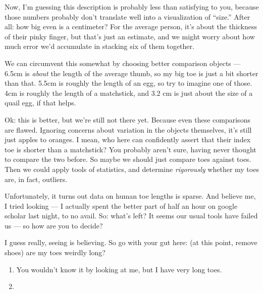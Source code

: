 \documentclass{fkpset}
\begin{document}
\begin{solution}[Outline.]
  Now, I'm guessing this description is probably less than satisfying to you,
  because those numbers probably don't translate well into a visualization of
  ``size.'' After all: how big even is a centimeter? For the average person,
  it's about the thickness of their pinky finger, but that's just an estimate,
  and we might worry about how much error we'd accumulate in stacking six of
  them together.

  We can circumvent this somewhat by choosing better comparison objects ---
  6.5\si{cm} is \emph{about} the length of the average thumb, so my big toe is
  just a bit shorter than that. 5.5\si{cm} is roughly the length of an egg, so
  try to imagine one of those. 4\si{cm} is roughly the length of a matchstick,
  and 3.2 \si{cm} is just about the size of a quail egg, if that helps.

  Ok: this is better, but we're still not there yet. Because even these
  comparisons are flawed. Ignoring concerns about variation in the objects
  themselves, it's still just apples to oranges. I mean, who here can
  confidently assert that their index toe is shorter than a matchstick? You
  probably aren't sure, having never thought to compare the two before. So maybe
  we should just compare toes against toes. Then we could apply tools of
  statistics, and determine \emph{rigorously} whether my toes are, in fact,
  outliers.

  Unfortunately, it turns out data on human toe lengths is sparse. And believe
  me, I tried looking --- I actually spent the better part of half an hour on
  google scholar last night, to no avail. So: what's left? It seems our usual
  tools have failed us --- so how are you to decide?

  I guess really, seeing is believing. So go with your gut here: (at this point,
  remove shoes) are my toes weirdly long?

  \begin{enumerate}
    \item You wouldn't know it by looking at me, but I have very long toes.
    \item
  \end{enumerate}

\end{solution}
\end{document}
